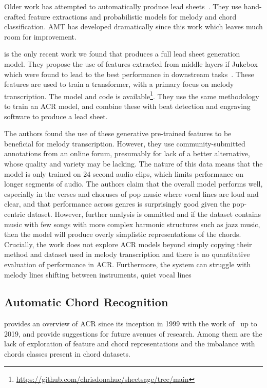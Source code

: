 Older work has attempted to automatically produce lead sheets~\citep{LeadSheet2008,LeadSheet2009}. They use hand-crafted feature extractions and probabilistic models for melody and chord classification. AMT has developed dramatically since this work which leaves much room for improvement.

\citep{MelodyTranscriptionViaGenerativePreTraining} is the only recent work we found that produces a full lead sheet generation model. They propose the use of features extracted from middle layers if Jukebox~\citep{Jukebox} which were found to lead to the best performance in downstream tasks~\citep{JukeBoxFeatureExtraction}. These features are used to train a transformer, with a primary focus on melody transcription. The model and code is available\footnote{\url{https://github.com/chrisdonahue/sheetsage/tree/main}}. They use the same methodology to train an ACR model, and combine these with beat detection and engraving software to produce a lead sheet.

The authors found the use of these generative pre-trained features to be beneficial for melody transcription. However, they use community-submitted annotations from an online forum, presumably for lack of a better alternative, whose quality and variety may be lacking. The nature of this data means that the model is only trained on 24 second audio clips, which limits performance on longer segments of audio. The authors claim that the overall model performs well, especially in the verses and choruses of pop music where vocal lines are loud and clear, and that performance across genres is surprisingly good given the pop-centric dataset. However, further analysis is ommitted and if the dataset contains music with few songs with more complex harmonic structures such as jazz music, then the model will produce overly simplistic representations of the chords. Crucially, the work does not explore ACR models beyond simply copying their method and dataset used in melody transcription and there is no quantitative evaluation of performance in ACR. Furthermore, the system can struggle with melody lines shifting between instruments, quiet vocal lines

\subsection{Automatic Chord Recognition}

\cite{20YearsofACR} provides an overview of ACR since its inception in 1999 with the work of~\citet{FujishimaACR} up to 2019, and provide suggestions for future avenues of research. Among them are the lack of exploration of feature and chord representations and the imbalance with chords classes present in chord datasets.

